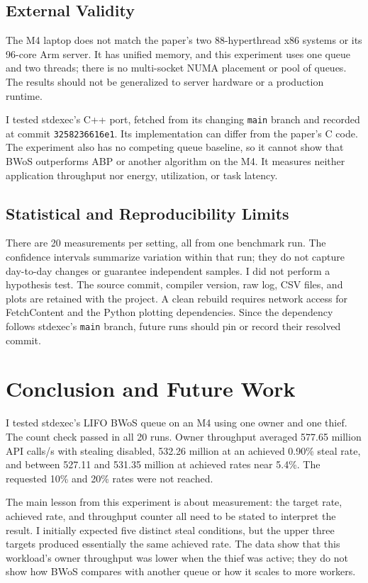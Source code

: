 \documentclass[conference]{IEEEtran}
\begin{document}
\subsection{External Validity}
The M4 laptop does not match the paper's two 88-hyperthread x86 systems or its 96-core Arm server. It has unified memory, and this experiment uses one queue and two threads; there is no multi-socket NUMA placement or pool of queues. The results should not be generalized to server hardware or a production runtime.

I tested stdexec's C++ port, fetched from its changing \texttt{main} branch and recorded at commit \texttt{3258236616e1}. Its implementation can differ from the paper's C code. The experiment also has no competing queue baseline, so it cannot show that BWoS outperforms ABP or another algorithm on the M4. It measures neither application throughput nor energy, utilization, or task latency.

\subsection{Statistical and Reproducibility Limits}
There are 20 measurements per setting, all from one benchmark run. The confidence intervals summarize variation within that run; they do not capture day-to-day changes or guarantee independent samples. I did not perform a hypothesis test. The source commit, compiler version, raw log, CSV files, and plots are retained with the project. A clean rebuild requires network access for FetchContent and the Python plotting dependencies. Since the dependency follows stdexec's \texttt{main} branch, future runs should pin or record their resolved commit.

\section{Conclusion and Future Work}
I tested stdexec's LIFO BWoS queue on an M4 using one owner and one thief. The count check passed in all 20 runs. Owner throughput averaged 577.65 million API calls/s with stealing disabled, 532.26 million at an achieved 0.90\% steal rate, and between 527.11 and 531.35 million at achieved rates near 5.4\%. The requested 10\% and 20\% rates were not reached.

The main lesson from this experiment is about measurement: the target rate, achieved rate, and throughput counter all need to be stated to interpret the result. I initially expected five distinct steal conditions, but the upper three targets produced essentially the same achieved rate. The data show that this workload's owner throughput was lower when the thief was active; they do not show how BWoS compares with another queue or how it scales to more workers.
\end{document}
